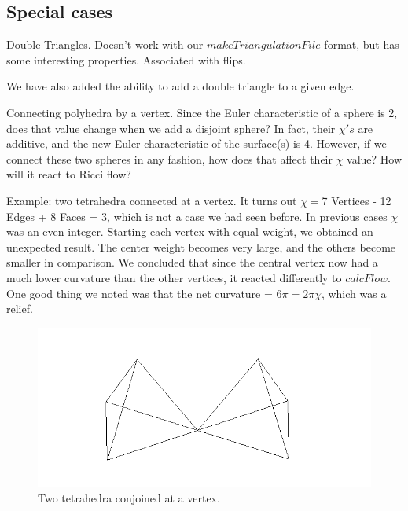 \documentclass[12pt]{article}
\begin{document}
\subsection{Special cases}
\maketitle

Double Triangles. Doesn't work with our $makeTriangulationFile$ format, but has some interesting properties. Associated with flips.\newline

\noindent We have also added the ability to add a double triangle to a given edge. 

\noindent Connecting polyhedra by a vertex. Since the Euler characteristic of a sphere is 2, does that value change when we add a disjoint sphere? In fact, their $\chi's$ are additive, and the new Euler characteristic of the surface(s) is 4. \cite{wiki}However, if we connect these two spheres in any fashion, how does that affect their $\chi$ value? How will it react to Ricci flow? \newline

\noindent Example: two tetrahedra connected at a vertex. It turns out $\chi = $7 Vertices - 12 Edges + 8 Faces = 3, which is not a case we had seen before. In previous cases $\chi$ was an even integer. Starting each vertex with equal weight, we obtained an unexpected result. The center weight becomes very large, and the others become smaller in comparison. We concluded that since the central vertex now had a much lower curvature than the other vertices, it reacted differently to $calcFlow$. One good thing we noted was that the net curvature = $6\pi = 2\pi\chi$, which was a relief.  

\begin{figure}
\includegraphics{tetratouch.png}
\caption{Two tetrahedra conjoined at a vertex.}
\label{fig:tt}
\end{figure}
\end{document}
